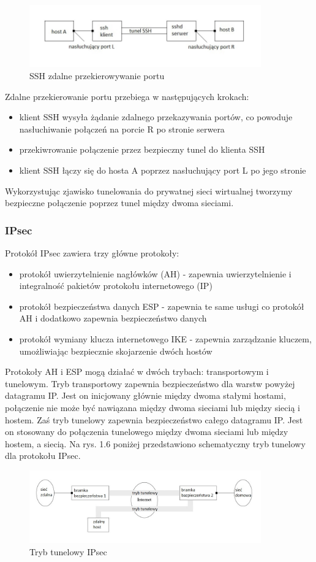 \documentclass[12p]{article}
\begin{document}
\begin{figure}[h]
\centering
\includegraphics[width=10cm]{przekierowywanie_zdalne_SSH.jpg}
\caption{SSH zdalne przekierowywanie portu}
\end{figure}

Zdalne przekierowanie portu przebiega w następujących krokach:
\begin{itemize}
\item klient SSH wysyła żądanie zdalnego przekazywania portów, co powoduje nasłuchiwanie połączeń na porcie R po stronie serwera
\item przekiwrowanie połączenie przez bezpieczny tunel do klienta SSH
\item klient SSH łączy się do hosta A poprzez nasłuchujący port L po jego stronie
\end{itemize}
\quad 
Wykorzystując zjawisko tunelowania do prywatnej sieci wirtualnej tworzymy bezpieczne połączenie poprzez tunel między dwoma sieciami. ~\cite{SSH}

\subsubsection{IPsec}
\quad Protokół IPsec zawiera trzy główne protokoły:
\begin{itemize}
\item protokół uwierzytelnienie nagłówków (AH) - zapewnia uwierzytelnienie i integralność pakietów protokołu internetowego (IP)
\item  protokół bezpieczeństwa danych ESP - zapewnia te same usługi co protokół AH i dodatkowo zapewnia bezpieczeństwo danych
\item protokół wymiany klucza internetowego IKE - zapewnia zarządzanie kluczem, umożliwiając bezpiecznie skojarzenie dwóch hostów 
\end{itemize}
\quad Protokoły AH i ESP mogą działać w dwóch trybach: transportowym i tunelowym. Tryb transportowy zapewnia bezpieczeństwo dla warstw powyżej datagramu IP. Jest on inicjowany głównie między dwoma stałymi hostami, połączenie nie może być nawiązana między dwoma sieciami lub między siecią i hostem. Zaś tryb tunelowy zapewnia bezpieczeństwo całego datagramu IP. Jest on stosowany do połączenia tunelowego między dwoma sieciami lub między hostem, a siecią. Na rys. 1.6 poniżej przedstawiono schematyczny tryb tunelowy dla protokołu IPsec.
\begin{figure}[h]
\centering
\includegraphics[width=10cm]{tryb_tunelowy_IPsec.jpg}
\caption{Tryb tunelowy IPsec}
\end{figure}
 
\end{document}
